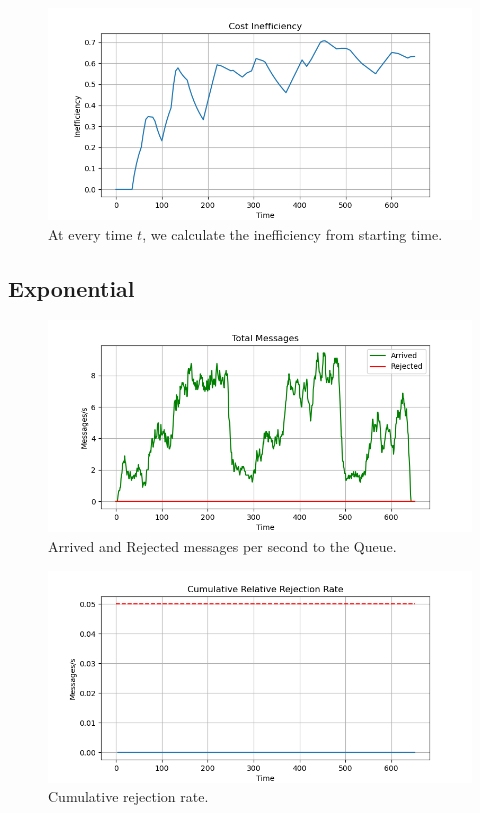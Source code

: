\begin{figure}[H]
    \centering
    \includegraphics[width=0.85\linewidth]{images/Uniform_Fast/inefficiency_cumulative.png}
    \caption{At every time $t$, we calculate the inefficiency from starting time.}
    \label{fig:uniform_fast_inefficiency}
\end{figure}
\newpage
\subsection{Exponential}
\begin{figure}[H]
    \centering
    \includegraphics[width=0.85\linewidth]{images/Exponential/messages.png}
    \caption{Arrived and Rejected messages per second to the Queue.}
    \label{fig:exponential_messages}
\end{figure}

\begin{figure}[H]
    \centering
    \includegraphics[width=0.85\linewidth]{images/Exponential/rejectiob_cumulative.png}
    \caption{Cumulative rejection rate.}
    \label{fig:exponential_rejection}
\end{figure}

